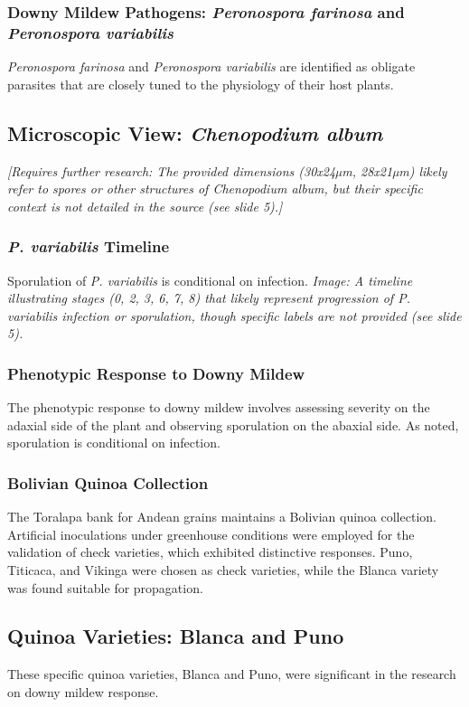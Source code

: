 \subsubsection*{Downy Mildew Pathogens: \textit{Peronospora farinosa} and \textit{Peronospora variabilis}} 
\textit{Peronospora farinosa} and \textit{Peronospora variabilis} are identified as obligate parasites that are closely tuned to the physiology of their host plants.

\subsection{Microscopic View: \textit{Chenopodium album}} 
\textit{[Requires further research: The provided dimensions (30x24µm, 28x21µm) likely refer to spores or other structures of \textit{Chenopodium album}, but their specific context is not detailed in the source (see slide 5).]}

\subsubsection*{\textit{P. variabilis} Timeline} 
Sporulation of \textit{P. variabilis} is conditional on infection. \textit{Image: A timeline illustrating stages (0, 2, 3, 6, 7, 8) that likely represent progression of \textit{P. variabilis} infection or sporulation, though specific labels are not provided (see slide 5).}

\subsubsection*{Phenotypic Response to Downy Mildew} 
The phenotypic response to downy mildew involves assessing severity on the adaxial side of the plant and observing sporulation on the abaxial side. As noted, sporulation is conditional on infection.

\subsubsection*{Bolivian Quinoa Collection} 
The Toralapa bank for Andean grains maintains a Bolivian quinoa collection. Artificial inoculations under greenhouse conditions were employed for the validation of check varieties, which exhibited distinctive responses. Puno, Titicaca, and Vikinga were chosen as check varieties, while the Blanca variety was found suitable for propagation.

\subsection{Quinoa Varieties: Blanca and Puno} 
These specific quinoa varieties, Blanca and Puno, were significant in the research on downy mildew response.

